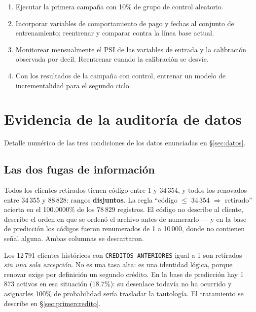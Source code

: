 \documentclass[11pt,a4paper]{article}
\begin{document}
\begin{enumerate}[leftmargin=*,nosep]
\item Ejecutar la primera campaña con 10\% de grupo de control aleatorio.
\item Incorporar variables de comportamiento de pago y fechas al conjunto de
      entrenamiento; reentrenar y comparar contra la línea base actual.
\item Monitorear mensualmente el PSI de las variables de entrada y la calibración
      observada por decil. Reentrenar cuando la calibración se desvíe.
\item Con los resultados de la campaña con control, entrenar un modelo de
      incrementalidad para el segundo ciclo.
\end{enumerate}

\appendix
\clearpage
\section{Evidencia de la auditoría de datos}
\label{ap:evidencia}

Detalle numérico de las tres condiciones de los datos enunciadas en
\S\ref{sec:datos}.

\subsection*{Las dos fugas de información}

\begin{alerta}[Hallazgo 1 --- los identificadores contienen la respuesta (AUC = 1.000)]
Todos los clientes retirados tienen código entre 1 y 34\,354, y todos los
renovados entre 34\,355 y 88\,828: rangos \textbf{disjuntos}. La regla
``código $\leq$ 34\,354 $\Rightarrow$ retirado'' acierta en el 100.0000\% de los
78\,829 registros. El código no describe al cliente, describe el orden en que se
ordenó el archivo antes de numerarlo --- y en la base de predicción los códigos
fueron renumerados de 1 a 10\,000, donde no contienen señal alguna. Ambas
columnas se descartaron.
\end{alerta}

\begin{alerta}
Los 12\,791 clientes históricos con \texttt{CREDITOS ANTERIORES} igual a 1 son
retirados \emph{sin una sola excepción}. No es una tasa alta: es una identidad
lógica, porque renovar exige por definición un segundo crédito. En la base de
predicción hay 1\,873 activos en esa situación (18.7\%): su desenlace todavía no
ha ocurrido y asignarles 100\% de probabilidad sería trasladar la tautología. El
tratamiento se describe en \S\ref{sec:primercredito}.
\end{alerta}
\end{document}
